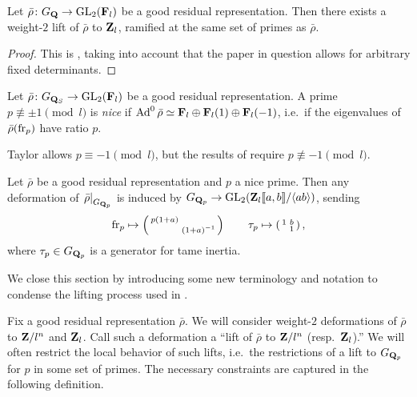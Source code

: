 \begin{theorem}\label{thm:always-can-lift}
Let $\bar\rho\colon G_{\mathbf{Q}} \to \operatorname{GL}_2(\mathbf{F}_l)$ be a good residual 
representation. Then there exists a weight-$2$ lift of $\bar\rho$ to $\mathbf{Z}_l$, 
ramified at the same set of primes as $\bar\rho$. 
\end{theorem}
\begin{proof}
This is \cite[Th.~1]{ramakrishna-2002}, taking into account that the paper in 
question allows for arbitrary fixed determinants. 
\end{proof}

\begin{definition}
Let $\bar\rho\colon G_{\mathbf{Q}_S} \to \operatorname{GL}_2(\mathbf{F}_l)$ be a good residual 
representation. A prime $p\not\equiv \pm 1\pmod l$ is \emph{nice} if 
$\operatorname{Ad}^0\bar\rho\simeq \mathbf{F}_l \oplus \mathbf{F}_l(1)\oplus \mathbf{F}_l(-1)$, i.e.~if the 
eigenvalues of $\bar\rho(\mathrm{fr}_p)$ have ratio $p$. 
\end{definition}

Taylor allows $p\equiv -1\pmod l$, but the results of \cite{pande-2011} 
require $p\not\equiv -1\pmod l$. 

\begin{theorem}
Let $\bar\rho$ be a good residual representation and $p$ a nice prime. Then 
any deformation of $\left.\bar\rho\right|_{G_{\mathbf{Q}_p}}$ is induced by 
$G_{\mathbf{Q}_p} \to \operatorname{GL}_2(\mathbf{Z}_l\llbracket a,b \rrbracket / \langle a b\rangle)$, sending 
\[
	\mathrm{fr}_p \mapsto \left(\begin{smallmatrix} p(1+a) &  \\  & (1+a)^{-1} \end{smallmatrix}\right) \qquad \tau_p \mapsto \left(\begin{smallmatrix} 1 & b \\  & 1 \end{smallmatrix}\right) ,
\]
where $\tau_p\in G_{\mathbf{Q}_p}$ is a generator for tame inertia. 
\end{theorem}

We close this section by introducing some new terminology and notation to 
condense the lifting process used in \cite{khare-larsen-ramakrishna-2005}. 

Fix a good residual representation $\bar\rho$. We will consider weight-$2$ 
deformations of $\bar\rho$ to $\mathbf{Z}/l^n$ and $\mathbf{Z}_l$. Call such a deformation a 
``lift of $\bar\rho$ to $\mathbf{Z}/l^n$ (resp.~$\mathbf{Z}_l$).'' We will often restrict the 
local behavior of such lifts, i.e.~the restrictions of a lift to $G_{\mathbf{Q}_p}$ 
for $p$ in some set of primes. The necessary constraints are captured in the 
following definition. 

